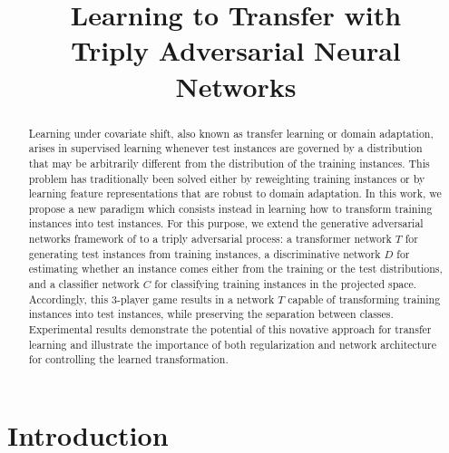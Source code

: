 \documentclass[aoas,preprint,authoryear]{imsart}
\begin{document}
\begin{frontmatter}
\title{Learning to Transfer with\\
       Triply Adversarial Neural Networks}


\author{ }

\begin{abstract}

Learning under covariate shift, also known as transfer learning or domain
adaptation, arises in supervised learning whenever test instances are governed
by a distribution that may be arbitrarily different from the distribution of the
training instances. This problem has traditionally been solved either by
reweighting training instances or by learning feature representations that are
robust to domain adaptation. In this work, we propose a new paradigm which
consists instead in learning how to transform training instances into test
instances. For this purpose, we extend the generative adversarial networks framework
of \cite{goodfellow2014generative} to a triply adversarial process: a transformer
network $T$ for generating test instances from training instances, a
discriminative network $D$ for estimating whether an instance comes either from
the training or the test distributions, and a classifier network $C$ for
classifying training instances in the projected space. Accordingly, this
3-player game results in a network $T$ capable of transforming training
instances into test instances, while preserving the separation between classes.
Experimental results demonstrate the potential of this novative approach for
transfer learning and illustrate the importance of both regularization and
network architecture for controlling the learned transformation.

\end{abstract}

\end{frontmatter}

\section{Introduction}
\end{document}
